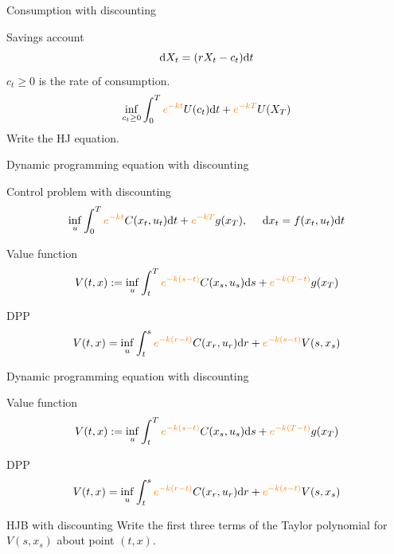 \documentclass[color=usenames,dvipsnames]{beamer}
\newcommand{\dd}{\text{\normalfont d}}
\newcommand{\dt}{\text{\normalfont d}t}
\newcommand{\ds}{\text{\normalfont d}s}
\newcommand{\dr}{\text{\normalfont d}r}
\newcommand{\dx}{\text{\normalfont d}x}
\begin{document}

\begin{frame}{Consumption with discounting}
    \begin{block}
        {Savings account}
        \[
        \dd{X}_t = (rX_t - c_t)\dt
        \]
        $c_t\ge0$ is the rate of consumption.
        \[
        \inf_{c_t\ge0} \int_0^T {\color{orange}e^{-kt}}U(c_t)\dt + {\color{orange}e^{-kT}}U(X_T)
        \]
        Write the HJ equation.
    \end{block}
\end{frame}


\begin{frame}{Dynamic programming equation with discounting}
    \begin{block}
        {Control problem with discounting}
        \[
        \inf_{u}\int_0^T {\color{orange}e^{-kt}}C(x_t,u_t)\dt+{\color{orange}e^{-kT}}g(x_T),~~~~\dx_t = f(x_t,u_t)\dt
        \]
    \end{block}
    \begin{block}
        {Value function}
        \[
        V(t,x):=\inf_{u}\int_t^T {\color{orange}e^{-k(s-t)}}C(x_s,u_s)\ds + {\color{orange}e^{-k(T-t)}}g(x_T)
        \]
    \end{block}
    \begin{block}
        {DPP}
        \[
        V(t,x)=\inf_{u}\int_t^s {\color{orange}e^{-k(r-t)}}C(x_r,u_r)\dr + {\color{orange}e^{-k(s-t)}}V(s,x_s)
        \]
    \end{block}
\end{frame}

\begin{frame}{Dynamic programming equation with discounting}
    \begin{block}
        {Value function}
        \[
        V(t,x):=\inf_{u}\int_t^T {\color{orange}e^{-k(s-t)}}C(x_s,u_s)\ds + {\color{orange}e^{-k(T-t)}}g(x_T)
        \]
    \end{block}
    \begin{block}
        {DPP}
        \[
        V(t,x)=\inf_{u}\int_t^s {\color{orange}e^{-k(r-t)}}C(x_r,u_r)\dr + {\color{orange}e^{-k(s-t)}}V(s,x_s)
        \]
    \end{block}
        \begin{block}
        {HJB with discounting}
        Write the first three terms of the Taylor polynomial for $V(s,x_s)$ about point $(t,x)$.
    \end{block}
\end{frame}
\end{document}
